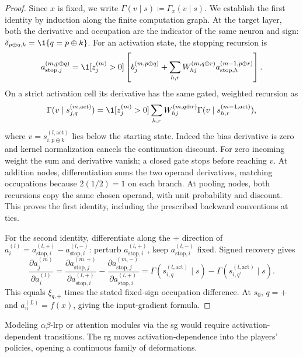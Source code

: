 \begin{proof}
Since $x$ is fixed, we write $\Gamma(v\mid s)\coloneqq\Gamma_x(v\mid s)$. We establish the first identity by induction along the finite computation graph. At the target layer, both the derivative and occupation are the indicator
of the same neuron and sign: $\delta_{p\oplus q,k}=\1\{q=p\oplus k\}$.
For an activation state, the stopping recursion is
\begin{equation}\label{ptnb:eq:adf-astop-recursion}
 a_{\mathrm{stop},j}^{(m,p\oplus q)}
 =\1[z_j^{(m)}>0]\left[b_j^{(m,p\oplus q)}+
 \sum_{h,r}W_{hj}^{(m,q\oplus r)}a_{\mathrm{stop},h}^{(m-1,p\oplus r)}\right].
\end{equation}
On a strict activation cell its derivative has the same gated, weighted recursion as
\[
 \Gamma(v\mid s_{j,q}^{(m,\mathrm{act})})
 =\1[z_j^{(m)}>0]\sum_{h,r}W_{hj}^{(m,q\oplus r)}
       \Gamma(v\mid s_{h,r}^{(m-1,\mathrm{act})}),
\]
where $v=s_{i,p\oplus k}^{(l,\mathrm{act})}$ lies below the starting state.
Indeed the bias derivative is zero and kernel normalization cancels the continuation discount.
For zero incoming weight the sum and derivative vanish; a closed gate stops before reaching $v$.
At addition nodes, differentiation sums the two operand derivatives, matching occupations because
$2(1/2)=1$ on each branch. At pooling nodes, both recursions copy the same chosen operand, with
unit probability and discount. This proves the first identity, including the prescribed backward
conventions at ties.

For the second identity, differentiate along the $+$ direction of $a_i^{(l)}=a_{\mathrm{stop},i}^{(l,+)}-
 a_{\mathrm{stop},i}^{(l,-)}$: perturb $a_{\mathrm{stop},i}^{(l,+)}$, keep $a_{\mathrm{stop},i}^{(l,-)}$ fixed. Signed recovery gives
\[
 \frac{\partial a_j^{(m)}}{\partial a_i^{(l)}}
 =\frac{\partial a_{\mathrm{stop},j}^{(m,+)}}{\partial a_{\mathrm{stop},i}^{(l,+)}}
  -\frac{\partial a_{\mathrm{stop},j}^{(m,-)}}{\partial a_{\mathrm{stop},i}^{(l,+)}}
 =\Gamma(s_{i,q}^{(l,\mathrm{act})}\mid s)-\Gamma(s_{i,q'}^{(l,\mathrm{act})}\mid s).
\]
This equals $\xi_{q,+}$ times the stated fixed-sign occupation difference. At $s_0$,
$q=+$ and $a_u^{(L)}=f(x)$, giving the input-gradient formula.
\end{proof}

Modeling $\alpha\beta$-\ac{lrp} or attention modules via the \ac{sg} would require
activation-dependent transitions. The \ac{rg} moves activation-dependence into the players'
policies, opening a continuous family of deformations.

